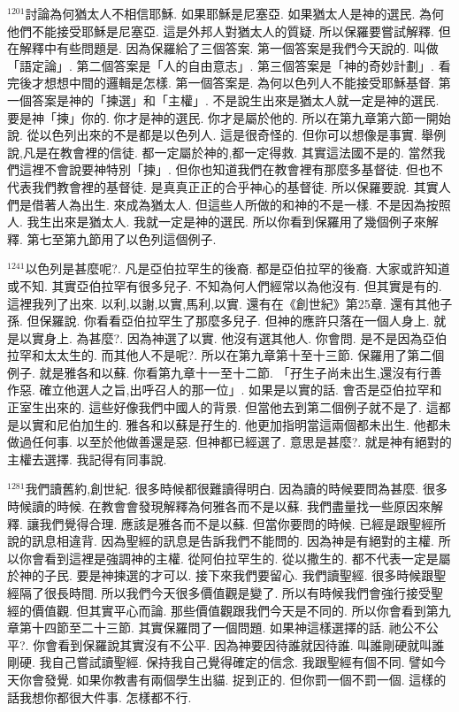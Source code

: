 \documentclass{book}
\begin{document}
$^{1201}$討論為何猶太人不相信耶穌.
如果耶穌是尼塞亞.
如果猶太人是神的選民.
為何他們不能接受耶穌是尼塞亞.
這是外邦人對猶太人的質疑.
所以保羅要嘗試解釋.
但在解釋中有些問題是.
因為保羅給了三個答案.
第一個答案是我們今天說的.
叫做「語定論」.
第二個答案是「人的自由意志」.
第三個答案是「神的奇妙計劃」.
看完後才想想中間的邏輯是怎樣.
第一個答案是.
為何以色列人不能接受耶穌基督.
第一個答案是神的「揀選」和「主權」.
不是說生出來是猶太人就一定是神的選民.
要是神「揀」你的.
你才是神的選民.
你才是屬於他的.
所以在第九章第六節一開始說.
從以色列出來的不是都是以色列人.
這是很奇怪的.
但你可以想像是事實.
舉例說,凡是在教會裡的信徒.
都一定屬於神的,都一定得救.
其實這法國不是的.
當然我們這裡不會說要神特別「揀」.
但你也知道我們在教會裡有那麼多基督徒.
但也不代表我們教會裡的基督徒.
是真真正正的合乎神心的基督徒.
所以保羅要說.
其實人們是借著人為出生.
來成為猶太人.
但這些人所做的和神的不是一樣.
不是因為按照人.
我生出來是猶太人.
我就一定是神的選民.
所以你看到保羅用了幾個例子來解釋.
第七至第九節用了以色列這個例子.

$^{1241}$以色列是甚麼呢?.
凡是亞伯拉罕生的後裔.
都是亞伯拉罕的後裔.
大家或許知道或不知.
其實亞伯拉罕有很多兒子.
不知為何人們經常以為他沒有.
但其實是有的.
這裡我列了出來.
以利,以謝,以實,馬利,以實.
還有在《創世紀》第25章.
還有其他子孫.
但保羅說.
你看看亞伯拉罕生了那麼多兒子.
但神的應許只落在一個人身上.
就是以實身上.
為甚麼?.
因為神選了以實.
他沒有選其他人.
你會問.
是不是因為亞伯拉罕和太太生的.
而其他人不是呢?.
所以在第九章第十至十三節.
保羅用了第二個例子.
就是雅各和以蘇.
你看第九章十一至十二節.
「孖生子尚未出生,還沒有行善作惡.
確立他選人之旨,出呼召人的那一位」.
如果是以實的話.
會否是亞伯拉罕和正室生出來的.
這些好像我們中國人的背景.
但當他去到第二個例子就不是了.
這都是以實和尼伯加生的.
雅各和以蘇是孖生的.
他更加指明當這兩個都未出生.
他都未做過任何事.
以至於他做善還是惡.
但神都已經選了.
意思是甚麼?.
就是神有絕對的主權去選擇.
我記得有同事說.

$^{1281}$我們讀舊約,創世紀.
很多時候都很難讀得明白.
因為讀的時候要問為甚麼.
很多時候讀的時候.
在教會會發現解釋為何雅各而不是以蘇.
我們盡量找一些原因來解釋.
讓我們覺得合理.
應該是雅各而不是以蘇.
但當你要問的時候.
已經是跟聖經所說的訊息相違背.
因為聖經的訊息是告訴我們不能問的.
因為神是有絕對的主權.
所以你會看到這裡是強調神的主權.
從阿伯拉罕生的.
從以撒生的.
都不代表一定是屬於神的子民.
要是神揀選的才可以.
接下來我們要留心.
我們讀聖經.
很多時候跟聖經隔了很長時間.
所以我們今天很多價值觀是變了.
所以有時候我們會強行接受聖經的價值觀.
但其實平心而論.
那些價值觀跟我們今天是不同的.
所以你會看到第九章第十四節至二十三節.
其實保羅問了一個問題.
如果神這樣選擇的話.
祂公不公平?.
你會看到保羅說其實沒有不公平.
因為神要因待誰就因待誰.
叫誰剛硬就叫誰剛硬.
我自己嘗試讀聖經.
保持我自己覺得確定的信念.
我跟聖經有個不同.
譬如今天你會發覺.
如果你教書有兩個學生出貓.
捉到正的.
但你罰一個不罰一個.
這樣的話我想你都很大件事.
怎樣都不行.
\end{document}

